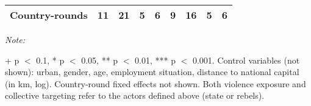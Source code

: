 \begin{table}[!h]
{\begin{threeparttable}
\begin{tabular}[t]{lcccccccc}
Country-rounds & 11 & 21 & 5 & 6 & 9 & 16 & 5 & 6\\
\bottomrule
\end{tabular}
\begin{tablenotes}[para]
\item \textit{Note: } 
\item + p $<$ 0.1, * p $<$ 0.05, ** p $<$ 0.01, *** p $<$ 0.001. Control variables (not shown): urban, gender, age, employment situation, distance to national capital (in km, log). Country-round fixed effects not shown. Both violence exposure and collective targeting refer to the actors defined above (state or rebels).
\end{tablenotes}
\end{threeparttable}}
\end{table}
